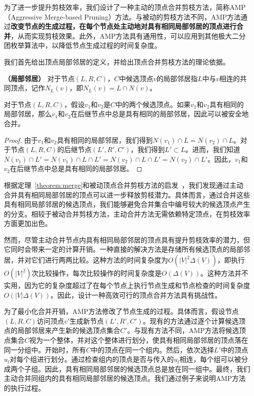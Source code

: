 为了进一步提升剪枝效率，我们设计了一种主动的顶点合并剪枝方法，简称AMP （Aggressive Merge-based Pruning）方法。与被动的剪枝方法不同，AMP方法通过\textbf{改变节点的生成过程，在每个节点处主动地对具有相同局部邻居的顶点进行合并}，从而实现剪枝效果。此外，AMP方法具有通用性，可以应用到其他极大二分团枚举算法中，以降低节点生成过程的时间复杂度。

我们首先给出顶点局部邻居的定义，并给出顶点合并剪枝方法的理论依据。

\begin{definition}
  \textbf{（局部邻居）} 对于节点$(L,R,C)$，$C$中候选顶点$v$的局部邻居指$L$中与$v$相连的共同顶点，记作$N_L(v)$，即$N_L(v) = L \cap N(v)$。
\end{definition}

\begin{theorem}
  对于节点$(L,R,C)$，假设$v_1$和$v_2$是$C$中的两个候选顶点。如果$v_1$和$v_2$具有相同的局部邻居，那么$v_1$和$v_2$在后继节点中总是具有相同的局部邻居，因此可以被安全地合并。
  \label{theorem:merge}
\end{theorem}

\begin{proof}
  由于$v_1$和$v_2$具有相同的局部邻居，我们得到$N(v_1)\cap L = N(v_2)\cap L$。对于节点$(L,R,C)$的后继节点$(L',R',C')$，我们得到$L' \subset L$。进而，我们知道$N(v_1)\cap L' = N(v_1) \cap L \cap L' = N(v_2) \cap L \cap L' = N(v_2)\cap L'$。因此，$v_1$和$v_2$在后继节点中总是具有相同的局部邻居。
\end{proof}


根据定理~\ref{theorem:merge}和被动顶点合并剪枝方法的启发~\cite{iMBEA14}，我们发现通过主动合并具有相同局部邻居的顶点可以进一步释放剪枝潜力。具体而言，通过合并这些具有相同局部邻居的候选顶点，我们能够避免合并集合中编号较大的候选顶点产生的分支。相较于被动合并剪枝方法，主动合并方法无需依赖特定顶点，在剪枝效率方面更加出色。

然而，尽管主动合并节点内具有相同局部邻居的顶点具有提升剪枝效率的潜力，但它同时会带来一定的计算开销。一种直接的解决方法是存储所有候选顶点的局部邻居，并对它们进行两两比较。这种方法的时间复杂度为$O(|V|^2\Delta(V))$，即执行$O(|V|^2)$次比较操作，每次比较操作的时间复杂度是$O(\Delta(V))$。这种方法并不实用，因为它的复杂度超过了在每个节点上执行节点生成和节点检查的时间复杂度$O(|V|\Delta(V))$。因此，设计一种高效可行的顶点合并方法具有挑战性。

为了最小化合并开销，AMP方法修改了节点生成的过程。具体而言，假设节点$(L,R,C)$访问顶点$v'$生成新节点$(L',R',C')$。现有的方法通过逐个计算候选顶点的局部邻居来产生新的候选顶点集合$C'$。与现有方法不同，AMP方法将候选顶点集合$C$视为一个整体，并对这个整体进行划分，使具有相同局部邻居的顶点落在同一分组中。开始时，所有$C$中的顶点在同一个组内。然后，依次选择$L'$中的顶点$u_l$对每个组进行划分。通过检查组内的顶点是否与传入的$u_l$相连，每个组可以被分成两个子组。因此，具有相同局部邻居的候选顶点总是放在同一组中。最终，我们主动合并同组内的具有相同局部邻居的候选顶点。我们通过例子来说明AMP方法的执行过程。


